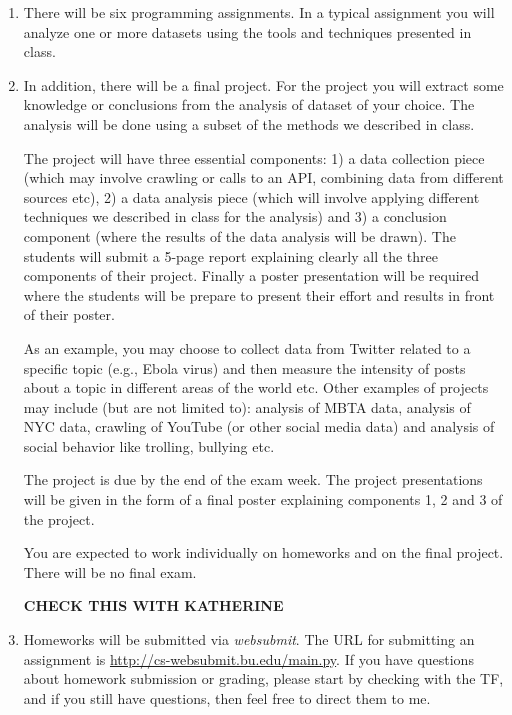\documentclass[11pt]{article}
\begin{document}
\begin{enumerate}
\item There will be six programming assignments.  In a typical 
assignment you will 
analyze one or more datasets using the tools and techniques presented in
class.

\item In addition, there will be a final project.  For the project you
  will extract some
knowledge or conclusions from the analysis of dataset of your choice. The analysis
will be done using a subset of the methods we described in class.

The project will have three essential components: 1) a data collection
piece (which may involve crawling or calls to an API, combining data
from different sources etc), 2) a data analysis piece (which will
involve applying different techniques we described in class for the
analysis) and 3) a conclusion component (where the results of the data
analysis will be drawn).  The students will submit a 5-page report
explaining clearly all the three components of their project. Finally a
poster presentation will be required where the students will be prepare
to present their effort and results in front of their poster. 

As an example, you may choose to collect data from Twitter related
to a specific topic (e.g., Ebola virus) and then measure the intensity
of posts about a topic in different areas of the world etc.  Other
examples of projects may include (but are not limited to): analysis of
MBTA data, analysis of NYC data, crawling of YouTube (or other social
media data) and analysis of social behavior like trolling, bullying
etc. 

The project is due by the end of the exam week. The project presentations will be
given in the form of a final poster explaining components 1, 2 and 3 of
the project. 

You are expected to work individually on homeworks and on the final
project.  There will be no final exam.   

\textbf{CHECK THIS WITH KATHERINE}

\item Homeworks will be submitted via \emph{websubmit}.   The URL for
  submitting an assignment is \url{http://cs-websubmit.bu.edu/main.py}.
  If you have questions about homework submission or grading, please start by checking
  with the TF, and if you still have questions, then feel free to direct them to me.
\end{enumerate}
\end{document}
